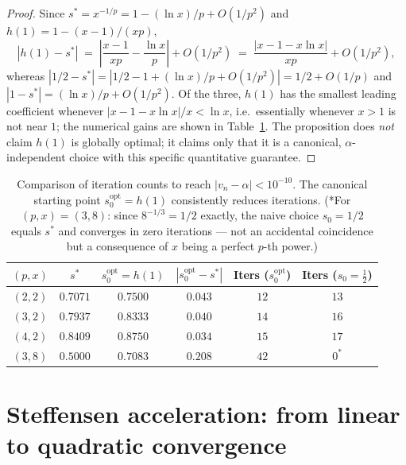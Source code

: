 \documentclass[11pt,a4paper]{article}
\theoremstyle{definition}
\begin{document}
\begin{proof}
Since $s^* = x^{-1/p} = 1 - (\ln x)/p + O(1/p^2)$ and $h(1) = 1 - (x-1)/(xp)$,
\[
  |h(1) - s^*| \;=\; \left|\frac{x-1}{xp} - \frac{\ln x}{p}\right| + O(1/p^2)
  \;=\; \frac{|x - 1 - x\ln x|}{xp} + O(1/p^2),
\]
whereas $|1/2 - s^*| = |1/2 - 1 + (\ln x)/p + O(1/p^2)| = 1/2 + O(1/p)$ and $|1 - s^*| = (\ln x)/p + O(1/p^2)$. Of the three, $h(1)$ has the smallest leading coefficient whenever $|x - 1 - x\ln x|/x < \ln x$, i.e.\ essentially whenever $x > 1$ is not near $1$; the numerical gains are shown in Table~\ref{tab:optimal-start-expo}. The proposition does \emph{not} claim $h(1)$ is globally optimal; it claims only that it is a canonical, $\alpha$-independent choice with this specific quantitative guarantee.
\end{proof}

\begin{table}[h]
\centering
\begin{tabular}{cccccc}
\toprule
$(p,x)$ & $s^*$ & $s_0^{\mathrm{opt}} = h(1)$ & $|s_0^{\mathrm{opt}} - s^*|$ & Iters ($s_0^{\mathrm{opt}}$) & Iters ($s_0 = \tfrac{1}{2}$) \\
\midrule
$(2,2)$ & $0.7071$ & $0.7500$ & $0.043$ & $12$ & $13$ \\
$(3,2)$ & $0.7937$ & $0.8333$ & $0.040$ & $14$ & $16$ \\
$(4,2)$ & $0.8409$ & $0.8750$ & $0.034$ & $15$ & $17$ \\
$(3,8)$ & $0.5000$ & $0.7083$ & $0.208$ & $42$ & $0^*$ \\
\bottomrule
\end{tabular}
\caption{Comparison of iteration counts to reach $|v_n - \alpha| < 10^{-10}$. The canonical starting point $s_0^{\mathrm{opt}} = h(1)$ consistently reduces iterations. (*For $(p, x) = (3, 8)$: since $8^{-1/3} = 1/2$ exactly, the naive choice $s_0 = 1/2$ equals $s^*$ and converges in zero iterations --- not an accidental coincidence but a consequence of $x$ being a perfect $p$-th power.)}
\label{tab:optimal-start-expo}
\end{table}

\section{Steffensen acceleration: from linear to quadratic convergence}
\label{sec:steffensen}
\end{document}

